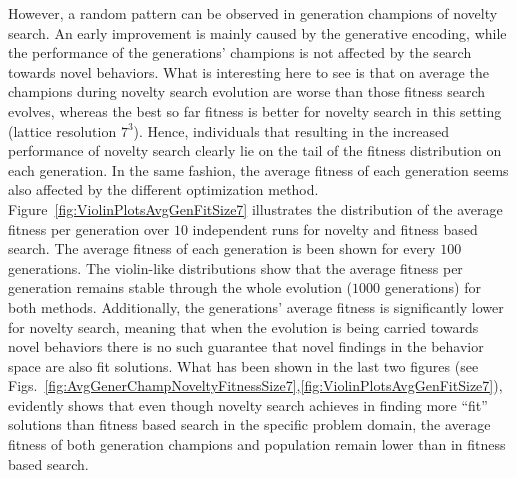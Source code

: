 However, a random pattern can be observed in generation champions of novelty search. An early improvement is mainly caused by the generative encoding, while the performance of the generations' champions is not affected by the search towards novel behaviors. What is interesting here to see is that on average the champions during novelty search evolution are worse than those fitness search evolves, whereas the best so far fitness is better for novelty search in this setting (lattice resolution $7^3$). Hence, individuals that resulting in the increased performance of novelty search clearly lie on the tail of the fitness distribution on each generation. In the same fashion, the average fitness of each generation seems also affected by the different optimization method. Figure~\ref{fig:ViolinPlotsAvgGenFitSize7} illustrates the distribution of the average fitness per generation over $10$ independent runs for novelty and fitness based search. The average fitness of each generation is been shown for every $100$ generations. The violin-like distributions show that the average fitness per generation remains stable through the whole evolution ($1000$ generations) for both methods. Additionally, the generations' average fitness is significantly lower for novelty search, meaning that when the evolution is being carried towards novel behaviors there is no such guarantee that novel findings in the behavior space are also  fit solutions. What has been shown in the last two figures (see Figs.~\ref{fig:AvgGenerChampNoveltyFitnessSize7},\ref{fig:ViolinPlotsAvgGenFitSize7}), evidently shows that even though novelty search achieves in finding more ``fit'' solutions than fitness based search in the specific problem domain, the average fitness of both generation champions and population remain lower than in fitness based search.


